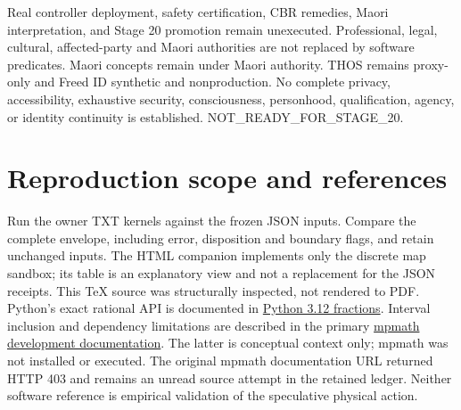 \documentclass[11pt]{article}
\begin{document}
Real controller deployment, safety certification, CBR remedies, Maori
interpretation, and Stage 20 promotion remain unexecuted. Professional, legal,
cultural, affected-party and Maori authorities are not replaced by software
predicates. Maori concepts remain under Maori authority. THOS remains
proxy-only and Freed ID synthetic and nonproduction. No complete privacy,
accessibility, exhaustive security, consciousness, personhood, qualification,
agency, or identity continuity is established. NOT\_READY\_FOR\_STAGE\_20.

\section{Reproduction scope and references}
Run the owner TXT kernels against the frozen JSON inputs. Compare the complete
envelope, including error, disposition and boundary flags, and retain unchanged
inputs. The HTML companion implements only the discrete map sandbox; its
table is an explanatory view and not a replacement for the JSON receipts.
This TeX source was structurally inspected, not rendered to PDF.
Python's exact rational API is documented in
\href{https://docs.python.org/3.12/library/fractions.html}{Python 3.12 fractions}.
Interval inclusion and dependency limitations are described in the primary
\href{https://mpmath.readthedocs.io/en/latest/contexts.html}{mpmath development documentation}.
The latter is conceptual context only; mpmath was not installed or executed.
The original mpmath documentation URL returned HTTP 403 and remains an unread
source attempt in the retained ledger. Neither software reference is empirical
validation of the speculative physical action.
\end{document}
